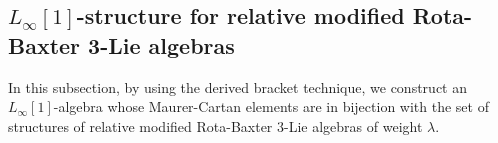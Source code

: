 \documentclass[12pt]{amsart}
\theoremstyle{definition}
\newtheorem{defn}[theorem]{Definition}
\begin{document}
%
%

\subsection{$L_\infty[1]$-structure for relative  modified Rota-Baxter 3-Lie algebras}\label{L infty  structure for relative  modified Rota-Baxter 3-Lie algebras}In this subsection, by using the derived bracket technique, we construct an
$L_\infty[1]$-algebra whose Maurer-Cartan elements are in bijection with the set of structures of relative
modified Rota-Baxter $3$-Lie algebras of weight $\lambda$.
\end{document}
